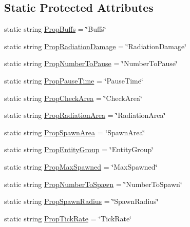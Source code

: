 \subsection*{Static Protected Attributes}
\begin{DoxyCompactItemize}
\item 
static string \mbox{\hyperlink{class_mort_spawner_script_a2208d8bc8cf97de90898e69c4486ec90}{Prop\+Buffs}} = \char`\"{}Buffs\char`\"{}
\item 
static string \mbox{\hyperlink{class_mort_spawner_script_a90c91970b15ca69a5f0fcb56973bd6a2}{Prop\+Radiation\+Damage}} = \char`\"{}Radiation\+Damage\char`\"{}
\item 
static string \mbox{\hyperlink{class_mort_spawner_script_a50e6df789030bedb738d79780ba9c178}{Prop\+Number\+To\+Pause}} = \char`\"{}Number\+To\+Pause\char`\"{}
\item 
static string \mbox{\hyperlink{class_mort_spawner_script_a347d14093338c95e96f378dc00f5984b}{Prop\+Pause\+Time}} = \char`\"{}Pause\+Time\char`\"{}
\item 
static string \mbox{\hyperlink{class_mort_spawner_script_aef811cbecdb15f0f965c96d926f1f0b6}{Prop\+Check\+Area}} = \char`\"{}Check\+Area\char`\"{}
\item 
static string \mbox{\hyperlink{class_mort_spawner_script_ae2b89b7aa97dc0f4fc4b9e5d5fd02f61}{Prop\+Radiation\+Area}} = \char`\"{}Radiation\+Area\char`\"{}
\item 
static string \mbox{\hyperlink{class_mort_spawner_script_aa1185926ce89868905762704ca421f1f}{Prop\+Spawn\+Area}} = \char`\"{}Spawn\+Area\char`\"{}
\item 
static string \mbox{\hyperlink{class_mort_spawner_script_adc3d5372d9b0d5ef02b94f9f7517f4c4}{Prop\+Entity\+Group}} = \char`\"{}Entity\+Group\char`\"{}
\item 
static string \mbox{\hyperlink{class_mort_spawner_script_a4f8545d6362f4d091c46a955e8fa6a00}{Prop\+Max\+Spawned}} = \char`\"{}Max\+Spawned\char`\"{}
\item 
static string \mbox{\hyperlink{class_mort_spawner_script_ae59156380decbb489a98b502993a5fe0}{Prop\+Number\+To\+Spawn}} = \char`\"{}Number\+To\+Spawn\char`\"{}
\item 
static string \mbox{\hyperlink{class_mort_spawner_script_a4013939fa84e48e9e3ba7b266f2b29bc}{Prop\+Spawn\+Radius}} = \char`\"{}Spawn\+Radius\char`\"{}
\item 
static string \mbox{\hyperlink{class_mort_spawner_script_adec0d47303c051fe4402e2446fa5b03f}{Prop\+Tick\+Rate}} = \char`\"{}Tick\+Rate\char`\"{}
\end{DoxyCompactItemize}


